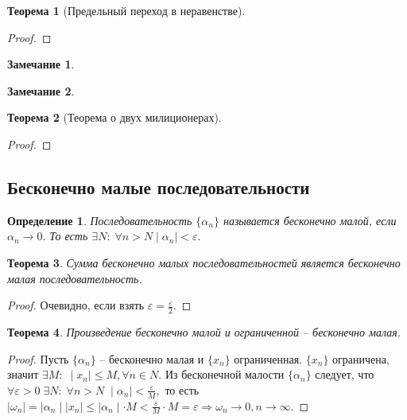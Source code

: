 \documentclass{article}
\newtheorem{Theorem}{Теорема}[section]
\newtheorem{Remark}{Замечание}[section]
\newtheorem{Definition}{Определение}[section]
\begin{document}
\begin{Theorem}[Предельный переход в неравенстве]

\end{Theorem}
\begin{proof}

\end{proof}

\begin{Remark}

\end{Remark}

\begin{Remark}

\end{Remark}

\begin{Theorem}[Теорема о двух милиционерах]

\end{Theorem}
\begin{proof}

\end{proof}

\subsection{Бесконечно малые последовательности}
\begin{Definition}
Последовательность $\{\alpha_n\}$ называется бесконечно малой, если $\alpha_n \rightarrow 0.$ То есть $\exists N: \; \forall n>N \mid\alpha_n\mid<\varepsilon.$
\end{Definition}

\begin{Theorem}
Сумма бесконечно малых последовательностей является бесконечно малая последовательность.
\end{Theorem}
\begin{proof}
Очевидно, если взять $\varepsilon=\frac{\varepsilon}{2}.$
\end{proof}

\begin{Theorem}
Произведение бесконечно малой и ограниченной -- бесконечно малая.
\end{Theorem}
\begin{proof}
Пусть $\{\alpha_n\}$ -- бесконечно малая и $\{x_n\}$ ограниченная. $\{x_n\}$ ограничена, значит $\exists M: \; \mid x_n\mid\leq M, \forall n\in N.$ Из бесконечной малости $\{\alpha_n\}$ следует, что $\forall\varepsilon>0 \; \exists N: \; \forall n>N \; \mid\alpha_n\mid<\frac{\varepsilon}{M},$ то есть $\mid\omega_n\mid=\mid\alpha_n\mid\mid x_n\mid\leq\mid\alpha_n\mid\cdot M<\frac{\varepsilon}{M}\cdot M=\varepsilon \Rightarrow \omega_n\rightarrow 0, n\rightarrow\infty.$
\end{proof}
\end{document}
